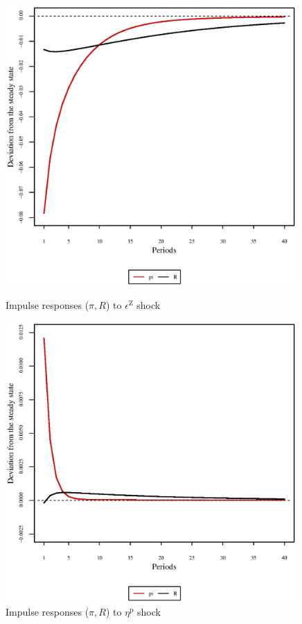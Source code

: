 \begin{figure}[h]
\begin{minipage}{0.5\textwidth}
\vspace*{-3em}
\centering
\includegraphics[width=0.99\textwidth, scale=0.55]{plots/plot_146.eps}
\caption{Impulse responses ($\pi, R$) to $\epsilon^{\mathrm{Z}}$ shock}
\end{minipage}
\begin{minipage}{0.5\textwidth}
\vspace*{-3em}
\centering
\includegraphics[width=0.99\textwidth, scale=0.55]{plots/plot_147.eps}
\caption{Impulse responses ($\pi, R$) to $\eta^{\mathrm{p}}$ shock}
\end{minipage}
\end{figure}

